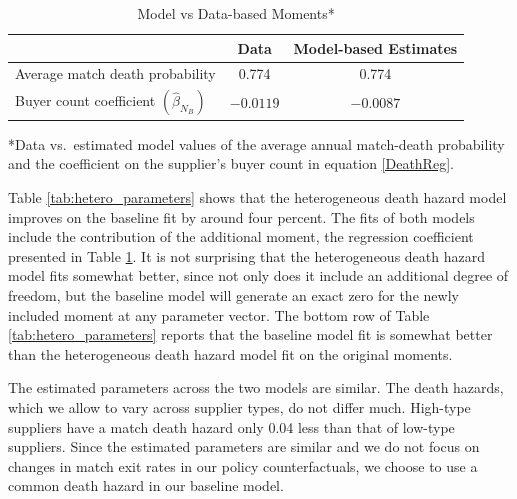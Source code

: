 \documentclass[12pt]{article} \usepackage{amsmath,amssymb,amsthm,geometry,graphicx,setspace,algorithm,algpseudocode,float}
\begin{document}
\begin{table}[htbp]
\caption{Model vs Data-based Moments*}
\label{tab:hetero_fit}
\centering
\begin{tabular}{lcc}
\toprule
& Data & Model-based Estimates \\
\midrule
Average match death probability & 0.774 & 0.774 \\
Buyer count coefficient $(\hat{\beta}_{N_B})$ & $-0.0119$ & $-0.0087$ \\
\bottomrule
\end{tabular}
\par\vspace{0.5em}
\begin{minipage}{\textwidth}\footnotesize
*Data vs.\ estimated model values of the average annual match-death probability and the coefficient on the supplier's buyer count in equation \ref{DeathReg}.
\end{minipage}
\end{table}
 Table \ref{tab:hetero_parameters} shows that the heterogeneous death hazard model improves on the baseline fit by around four percent.  The fits of both models include the contribution of the additional moment, the regression coefficient presented in Table \ref{tab:hetero_fit}. It is not surprising that the heterogeneous death hazard model fits somewhat better, since not only does it include an additional degree of freedom, but the baseline model will generate an exact zero for the newly included moment at any parameter vector.  The bottom row of Table \ref{tab:hetero_parameters} reports that the baseline model fit is somewhat better than the heterogeneous death hazard model fit on the original moments. 
 
 The estimated parameters across the two models are similar.  The death hazards, which we allow to vary across supplier types, do not differ much.  High-type suppliers have a match death hazard only 0.04 less than that of low-type suppliers. Since the estimated parameters are similar and we do not focus on changes in match exit rates in our policy counterfactuals, we choose to use a common death hazard in our baseline model.
\end{document}
